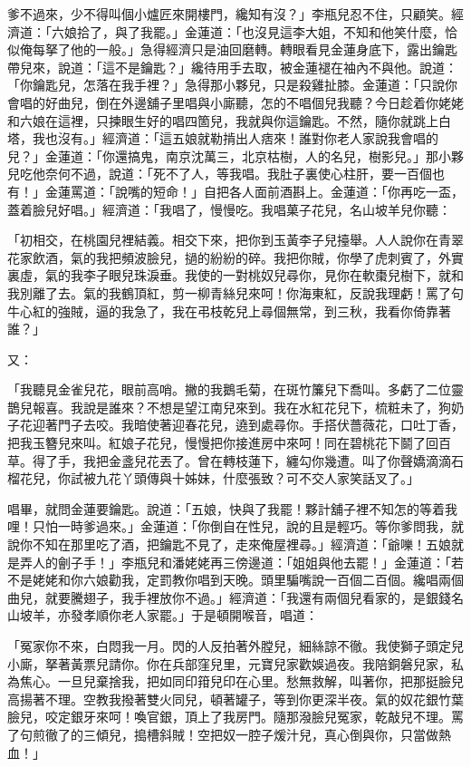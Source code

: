 爹不過來，少不得叫個小爐匠來開樓門，纔知有沒？」李瓶兒忍不住，只顧笑。經濟道：「六娘拾了，與了我罷。」金蓮道：「也沒見這李大姐，不知和他笑什麼，恰似俺每拏了他的一般。」急得經濟只是油回磨轉。轉眼看見金蓮身底下，露出鑰匙帶兒來，說道：「這不是鑰匙？」纔待用手去取，被金蓮褪在袖內不與他。說道：「你鑰匙兒，怎落在我手裡？」急得那小夥兒，只是殺雞扯膝。金蓮道：「只說你會唱的好曲兒，倒在外邊舖子里唱與小廝聽，怎的不唱個兒我聽？今日趁着你姥姥和六娘在這裡，只揀眼生好的唱四箇兒，我就與你這鑰匙。不然，隨你就跳上白塔，我也沒有。」經濟道：「這五娘就勒掯出人痞來！誰對你老人家說我會唱的兒？」金蓮道：「你還搞鬼，南京沈萬三，北京枯樹，人的名兒，樹影兒。」那小夥兒吃他奈何不過，說道：「死不了人，等我唱。我肚子裏使心柱肝，要一百個也有！」金蓮罵道：「說嘴的短命！」自把各人面前酒斟上。金蓮道：「你再吃一盃，蓋着臉兒好唱。」經濟道：「我唱了，慢慢吃。我唱菓子花兒，名山坡羊兒你聽：

「初相交，在桃園兒裡結義。相交下來，把你到玉黃李子兒擡舉。人人說你在青翠花家飲酒，氣的我把頻波臉兒，撾的紛紛的碎。我把你賊，你學了虎刺賓了，外實裏虛，氣的我李子眼兒珠淚垂。我使的一對桃奴兒尋你，見你在軟棗兒樹下，就和我別離了去。氣的我鶴頂紅，剪一柳青絲兒來呵！你海東紅，反說我理虧！罵了句牛心紅的強賊，逼的我急了，我在弔枝乾兒上尋個無常，到三秋，我看你倚靠著誰？」

又：

「我聽見金雀兒花，眼前高哨。撇的我鵝毛菊，在斑竹簾兒下喬叫。多虧了二位靈鵲兒報喜。我說是誰來？不想是望江南兒來到。我在水紅花兒下，梳粧未了，狗奶子花迎著門子去咬。我暗使著迎春花兒，遶到處尋你。手搭伏薔薇花，口吐丁香，把我玉簪兒來叫。紅娘子花兒，慢慢把你接進房中來呵！同在碧桃花下鬬了回百草。得了手，我把金盞兒花丟了。曾在轉枝蓮下，纏勾你幾遭。叫了你聲嬌滴滴石榴花兒，你試被九花丫頭傳與十姊妹，什麼張致？可不交人家笑話叉了。」

唱畢，就問金蓮要鑰匙。說道：「五娘，快與了我罷！夥計舖子裡不知怎的等着我哩！只怕一時爹過來。」金蓮道：「你倒自在性兒，說的且是輕巧。等你爹問我，就說你不知在那里吃了酒，把鑰匙不見了，走來俺屋裡尋。」經濟道：「爺嚛！五娘就是弄人的劊子手！」李瓶兒和潘姥姥再三傍邊道：「姐姐與他去罷！」金蓮道：「若不是姥姥和你六娘勸我，定罰教你唱到天晚。頭里騙嘴說一百個二百個。纔唱兩個曲兒，就要騰翅子，我手裡放你不過。」經濟道：「我還有兩個兒看家的，是銀錢名山坡羊，亦發孝順你老人家罷。」于是頓開喉音，唱道：

「冤家你不來，白悶我一月。閃的人反拍著外膛兒，細絲諒不徹。我使獅子頭定兒小廝，拏著黃票兒請你。你在兵部窪兒里，元寶兒家歡娛過夜。我陪銅磐兒家，私為焦心。一旦兒棄捨我，把如同印箝兒印在心里。愁無救解，叫著你，把那挺臉兒高揚著不理。空教我撥著雙火同兒，頓著罐子，等到你更深半夜。氣的奴花銀竹葉臉兒，咬定銀牙來呵！喚官銀，頂上了我房門。隨那潑臉兒冤家，乾敲兒不理。罵了句煎徹了的三傾兒，搗槽斜賊！空把奴一腔子煖汁兒，真心倒與你，只當做熱血！」

